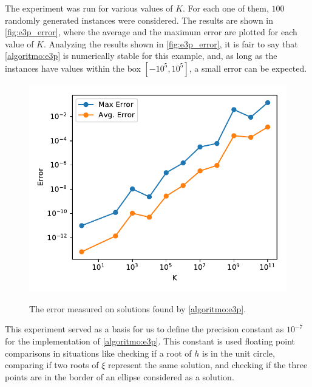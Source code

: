 The experiment was run for various values of $K$. For each one of them, $100$ randomly generated instances were considered. The results are shown in \autoref{fig:e3p_error}, where the average and the maximum error are plotted for each value of $K$. Analyzing the results shown in \autoref{fig:e3p_error}, it is fair to say that \autoref{algoritmo:e3p} is numerically stable for this example, and, as long as the instances have values within the box $[-10^5, 10^5]$, a small error can be expected.

\begin{figure}[H]
	\centering
	\caption{The error measured on solutions found by \autoref{algoritmo:e3p}.}
	\includegraphics[scale=.9]{tex/figures/e3p_error}
	\fautor
	\label{fig:e3p_error}
\end{figure}

This experiment served as a basis for us to define the precision constant as $10^{-7}$ for the implementation of \autoref{algoritmo:e3p}. 
This constant is used floating point comparisons in situations like checking if a root of $h$ is in the unit circle, comparing if two roots of $\xi$ represent the same solution, and checking if the three points are in the border of an ellipse considered as a solution.